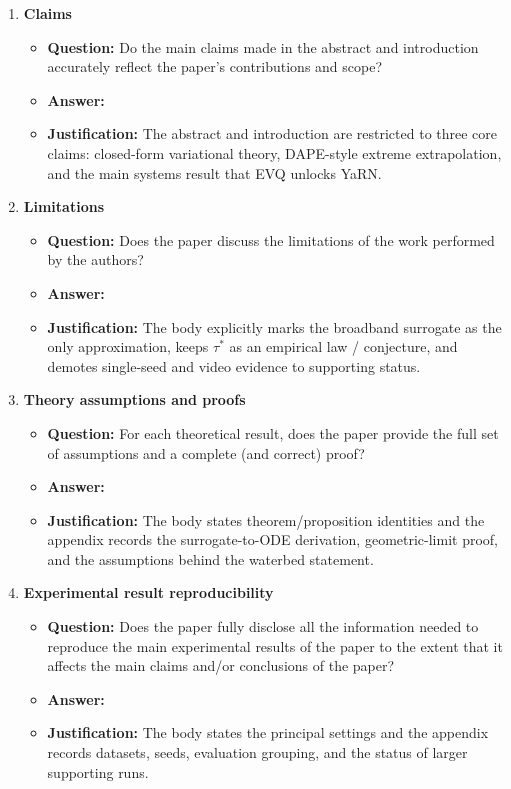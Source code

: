 \documentclass{article}
\begin{document}
\begin{enumerate}
\item \textbf{Claims}
\begin{itemize}
\item \textbf{Question:} Do the main claims made in the abstract and introduction accurately reflect the paper's contributions and scope?
\item \textbf{Answer:} \answerYes{}
\item \textbf{Justification:} The abstract and introduction are restricted to three core claims: closed-form variational theory, DAPE-style extreme extrapolation, and the main systems result that EVQ unlocks YaRN.
\end{itemize}

\item \textbf{Limitations}
\begin{itemize}
\item \textbf{Question:} Does the paper discuss the limitations of the work performed by the authors?
\item \textbf{Answer:} \answerYes{}
\item \textbf{Justification:} The body explicitly marks the broadband surrogate as the only approximation, keeps \(\tau^*\) as an empirical law / conjecture, and demotes single-seed and video evidence to supporting status.
\end{itemize}

\item \textbf{Theory assumptions and proofs}
\begin{itemize}
\item \textbf{Question:} For each theoretical result, does the paper provide the full set of assumptions and a complete (and correct) proof?
\item \textbf{Answer:} \answerYes{}
\item \textbf{Justification:} The body states theorem/proposition identities and the appendix records the surrogate-to-ODE derivation, geometric-limit proof, and the assumptions behind the waterbed statement.
\end{itemize}

\item \textbf{Experimental result reproducibility}
\begin{itemize}
\item \textbf{Question:} Does the paper fully disclose all the information needed to reproduce the main experimental results of the paper to the extent that it affects the main claims and/or conclusions of the paper?
\item \textbf{Answer:} \answerYes{}
\item \textbf{Justification:} The body states the principal settings and the appendix records datasets, seeds, evaluation grouping, and the status of larger supporting runs.
\end{itemize}


\end{enumerate}
\end{document}
